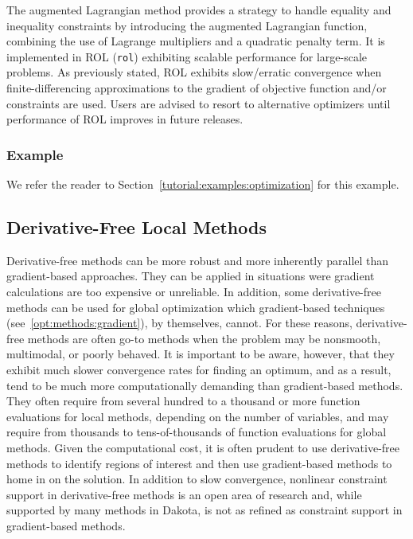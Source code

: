 The augmented Lagrangian method provides a strategy to handle equality 
and inequality constraints by introducing the augmented Lagrangian 
function, combining the use of Lagrange multipliers and a quadratic 
penalty term. It is implemented in ROL (\texttt{rol}) exhibiting 
scalable performance for large-scale problems. As previously stated, 
ROL exhibits slow/erratic convergence when finite-differencing 
approximations to the gradient of objective function and/or constraints 
are used. Users are advised to resort to alternative optimizers until 
performance of ROL improves in future releases.

\subsubsection{Example}
\label{opt:methods:gradient:example}

We refer the reader to Section~\ref{tutorial:examples:optimization}
for this example.

\subsection{Derivative-Free Local Methods}
\label{opt:methods:gradientfree:local}

Derivative-free methods can be more robust and more inherently
parallel than gradient-based approaches. They can be applied in
situations were gradient calculations are too expensive or
unreliable. In addition, some derivative-free methods can be used for
global optimization which gradient-based techniques
(see~\ref{opt:methods:gradient}), by themselves,
cannot. For these reasons, derivative-free methods are often go-to
methods when the problem may be nonsmooth, multimodal, or poorly
behaved.  It is important to be aware, however, that they exhibit much
slower convergence rates for finding an optimum, and as a result, tend
to be much more computationally demanding than gradient-based
methods. They often require from several hundred to a thousand or more
function evaluations for local methods, depending on the number of
variables, and may require from thousands to tens-of-thousands of
function evaluations for global methods. Given the computational cost,
it is often prudent to use derivative-free methods to identify regions
of interest and then use gradient-based methods to home in on the
solution.  In addition to slow convergence, nonlinear constraint
support in derivative-free methods is an open area of research and,
while supported by many methods in Dakota, is not as refined as
constraint support in gradient-based methods.

